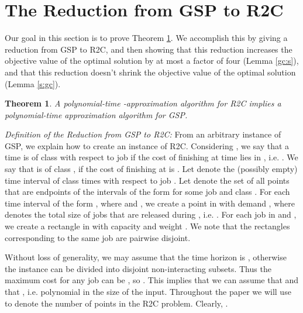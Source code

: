 \documentclass[11pt]{article}
\newtheorem{thm}{Theorem}
\begin{document}
\section{The Reduction from GSP to R2C}
\label{sec:reduce} 
Our goal in this section is to prove Theorem \ref{red}.
We accomplish this by giving a reduction from GSP
to R2C, and then showing that this reduction increases the objective 
value of the optimal solution by at most a factor of four
(Lemma \ref{gc:s}), and that this reduction doesn't shrink the
objective value of the optimal solution (Lemma \ref{s:gc}).

\begin{thm}
\label{red}
A polynomial-time -approximation algorithm for R2C 
implies a polynomial-time  approximation algorithm for GSP.
\end{thm}


\medskip

{\em Definition of the Reduction from GSP to R2C:}
From an arbitrary instance  of GSP,
we explain how to create an instance  of R2C.
Considering ,
we say that a time  is of class  with respect to job  if 
the cost of finishing  at time  lies in , 
i.e.  . We say that  is of class , if the cost of finishing  at  is .
Let  denote the (possibly empty) time interval of class  times with respect to job .
Let  denote the set of all points that are endpoints of the intervals 
of the form  for some job  and class . 
For each time interval  of the form , 
where  and , we create a point  in 
with demand
, where  denotes the total size of jobs that are released during , 
i.e. .
For each job  in  
and , we create a rectangle 
in  with capacity  and weight .
We note that the rectangles  corresponding to the same job are pairwise disjoint.

Without loss of generality, we may assume that the time horizon is ,
otherwise the instance can be divided into disjoint non-interacting subsets.
Thus the maximum cost for any job can be , so . This implies that 
we can assume that  and that  , 
i.e. polynomial in the size of the input. 
Throughout the paper we will use  to denote the number of points in the R2C problem.
Clearly, . 
\end{document}
